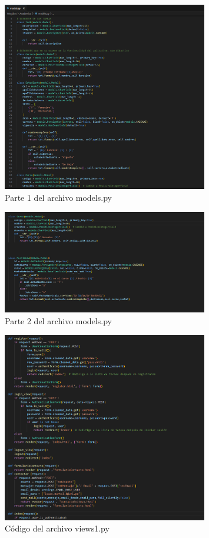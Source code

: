 \documentclass[12pt, a4paper]{article}
\begin{document}
\begin{figure}[ht]
	\centering
	\includegraphics[width=0.8\textwidth]{images/models1.png}
	\caption{Parte 1 del archivo models.py}
	\label{fig:models1}
\end{figure}

\begin{figure}[ht]
	\centering
	\includegraphics[width=0.8\textwidth]{images/models2.png}
	\caption{Parte 2 del archivo models.py}
	\label{fig:models2}
\end{figure}

\begin{figure}[ht]
	\centering
	\includegraphics[width=0.8\textwidth]{images/views1.png}
	\caption{Código del archivo views1.py}
	\label{fig:views1}
\end{figure}
\end{document}
